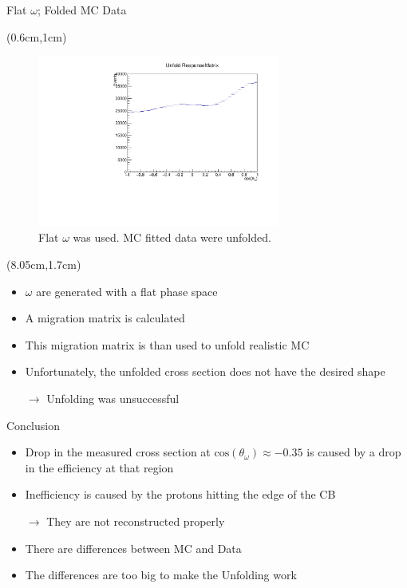 \documentclass[
		10pt
		]{beamer}
\begin{document}
\begin{frame}{Flat $\omega$; Folded MC Data}



	
	\begin{textblock*}{6.5cm}(0.6cm,1cm)
		
		\begin{figure} 
		
		\includegraphics[width=8cm]{Plots/FlatMC.pdf}
		\captionsetup{labelformat=empty}
		\caption{Flat $\omega$ was used. MC fitted data were unfolded.}
\end{figure}	
\end{textblock*}

\begin{textblock*}{4.5cm}(8.05cm,1.7cm)
	\begin{itemize}
		
		\item $\omega$ are generated with a flat phase space
		\item A migration matrix is calculated 
		\item This migration matrix is than used to unfold realistic MC 
		\item Unfortunately, the unfolded cross section does not have the desired shape
		
		$\rightarrow$ Unfolding was unsuccessful
	\end{itemize}
\end{textblock*}


\end{frame}





\begin{frame}{Conclusion}
	\begin{itemize}
		\item Drop in the measured cross section at $\textrm{cos}(\theta_{\omega}) \approx -0.35$ is caused by a drop in the efficiency at that region
		\item Inefficiency is caused by the protons hitting the edge of the CB
		
		$\rightarrow$ They are not reconstructed properly
		\item There are differences between MC and Data
		\item The differences are too big to make the Unfolding work
		
	\end{itemize}
	
	
\end{frame}
\end{document}
